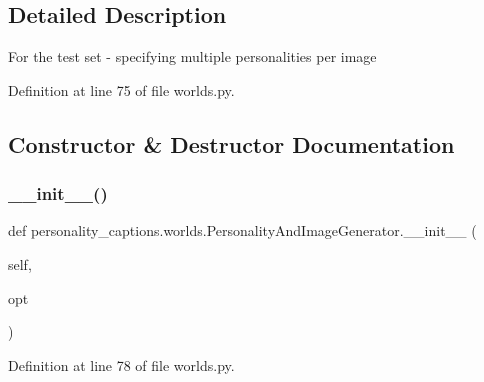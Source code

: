 \subsection{Detailed Description}
\begin{DoxyVerb}For the test set - specifying multiple personalities per image\end{DoxyVerb}
 

Definition at line 75 of file worlds.\+py.



\subsection{Constructor \& Destructor Documentation}
\mbox{\label{classpersonality__captions_1_1worlds_1_1PersonalityAndImageGenerator_a2c0bf3982f19884f2ac82873c1b9f5ce}} 
\subsubsection{\texorpdfstring{\+\_\+\+\_\+init\+\_\+\+\_\+()}{\_\_init\_\_()}}
{\footnotesize\ttfamily def personality\+\_\+captions.\+worlds.\+Personality\+And\+Image\+Generator.\+\_\+\+\_\+init\+\_\+\+\_\+ (\begin{DoxyParamCaption}\item[{}]{self,  }\item[{}]{opt }\end{DoxyParamCaption})}



Definition at line 78 of file worlds.\+py.


